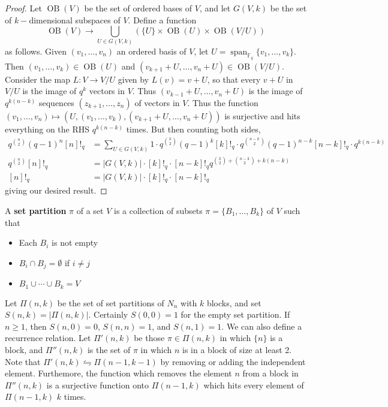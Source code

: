 \documentclass[11pt, a4paper]{memoir}
\DeclareMathOperator{\F}{{\mathbb{F}}}
\theoremstyle{change}
\theoremstyle{plain}
\theoremstyle{nonumberplain}
\newtheorem{proof}{Proof}
\DeclareMathOperator{\spn}{span}
\DeclareMathOperator{\OB}{OB}
\numberwithin{equation}{section}
\begin{document}
\begin{proof}
    Let $\OB(V)$ be the set of ordered bases of $V$, and let $G(V,k)$ be the set of $k-$dimensional subspaces of $V$.
    Define a function
    \begin{equation*}
        \OB(V)\to\bigcup_{U\in G(V,k)}\left(\{U\}\times\OB(U)\times\OB(V/U)\right)
    \end{equation*}
    as follows.
    Given $(v_1,\ldots,v_n)$ an ordered basis of $V$, let $U=\spn_{\F_q}\{v_1,\ldots,v_k\}$.
    Then $(v_1,\ldots,v_k)\in\OB(U)$ and $(v_{k+1}+U,\ldots,v_n+U)\in\OB(V/U)$.
    Consider the map $L:V\to V/U$ given by $L(v)=v+U$, so that every $v+U$ in $V/U$ is the image of $q^k$ vectors in $V$.
    Thus $(v_{k-1}+U,\ldots,v_n+U)$ is the image of $q^{k(n-k)}$ sequences $(z_{k+1},\ldots,z_n)$ of vectors in $V$.
    Thus the function $(v_1,\ldots,v_n)\mapsto(U,(v_1,\ldots,v_k),(v_{k+1}+U,\ldots,v_n+U))$ is surjective and hits everything on the RHS $q^{k(n-k)}$ times.
    But then counting both sides,
    \begin{align*}
        q^{\binom{n}{2}}(q-1)^n[n]!_q &= \sum_{U\in G(V,k)}1\cdot q^{\binom{k}{2}}(q-1)^k[k]!_q\cdot q^{\binom{n-k}{2}}(q-1)^{n-k}[n-k]!_q\cdot q^{k(n-k)}\\
        q^{\binom{n}{2}}[n]!_q &= |G(V,k)|\cdot[k]!_q\cdot[n-k]!_q q^{\binom{k}{2}+\binom{n-k}{2}+k(n-k)}\\
        [n]!_q &= |G(V,k)|\cdot[k]!_q\cdot[n-k]!_q
    \end{align*}
    giving our desired result.
\end{proof}
A \textbf{set partition} $\pi$ of a set $V$ is a collection of subsets $\pi=\{B_1,\ldots,B_k\}$ of $V$ such that
\begin{itemize}[nl]
    \item Each $B_i$ is not empty
    \item $B_i\cap B_j=\emptyset$ if $i\neq j$
    \item $B_1\cup\cdots\cup B_k=V$
\end{itemize}
Let $\Pi(n,k)$ be the set of set partitions of $N_n$ with $k$ blocks, and set $S(n,k)=|\Pi(n,k)|$.
Certainly $S(0,0)=1$ for the empty set partition.
If $n\geq 1$, then $S(n,0)=0$, $S(n,n)=1$, and $S(n,1)=1$.
We can also define a recurrence relation.
Let $\Pi'(n,k)$ be those $\pi\in\Pi(n,k)$ in which $\{n\}$ is a block, and $\Pi''(n,k)$ is the set of $\pi$ in which $n$ is in a block of size at least 2.
Note that $\Pi'(n,k)\leftrightharpoons\Pi(n-1,k-1)$ by removing or adding the independent element.
Furthemore, the function which removes the element $n$ from a block in $\Pi''(n,k)$ is a surjective function onto $\Pi(n-1,k)$ which hits every element of $\Pi(n-1,k)$ $k$ times.
\end{document}
